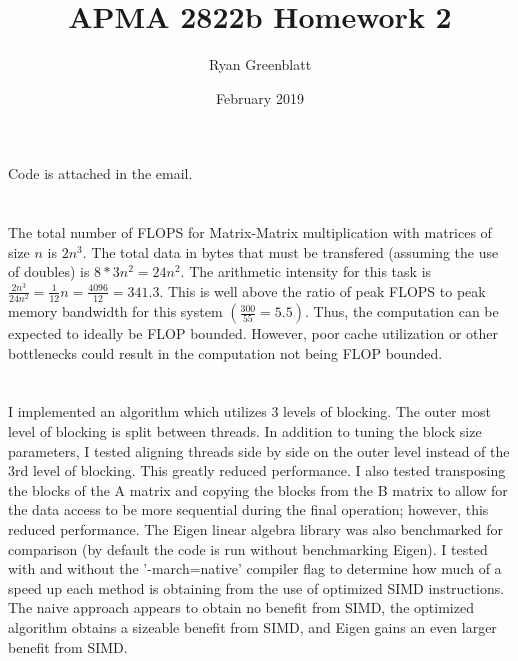 \documentclass{article}
\title{APMA 2822b Homework 2}
\author{Ryan Greenblatt}
\date{February 2019}
\begin{document}
\setlength\parindent{0pt}

\renewcommand{\thesubsection}{\alph{subsection}}

\maketitle

\section{}

Code is attached in the email.

\section{}


The total number of FLOPS for Matrix-Matrix multiplication with matrices of size $n$ is $2 n^3$. The 
total data in bytes that must be transfered (assuming the use of doubles) is 
$8 * 3 n^2 = 24 n^2$. The arithmetic intensity for this task is 
$\frac{2n^3}{24n^2} = \frac1{12} n = \frac{4096}{12} = 341.3$. This is well above the ratio of
peak FLOPS to peak memory bandwidth for this system $(\frac{300}{55} = 5.5)$. Thus, the 
computation can be expected to ideally be FLOP bounded. However, poor cache utilization
or other bottlenecks could result in the computation not being FLOP bounded.

\section{}

I implemented an algorithm which utilizes 3 levels of blocking. The outer most level of blocking is
split between threads. In addition to tuning the block size parameters, I tested aligning
threads side by side on the outer level instead of the 3rd level of blocking. This greatly reduced
performance. I also tested transposing the blocks of the A matrix and copying the blocks from the
B matrix to allow for the data access to be more sequential during the final operation; however, 
this reduced performance.  The Eigen linear algebra library was also benchmarked for comparison
(by default the code is run without benchmarking Eigen).  I tested with and without the '-march=native'
compiler flag to determine how much of a speed up each method is obtaining from the use of optimized 
SIMD instructions. The naive approach appears to obtain no benefit from SIMD, the optimized 
algorithm obtains a sizeable benefit from SIMD, and Eigen gains an even larger benefit from SIMD.
\end{document}
